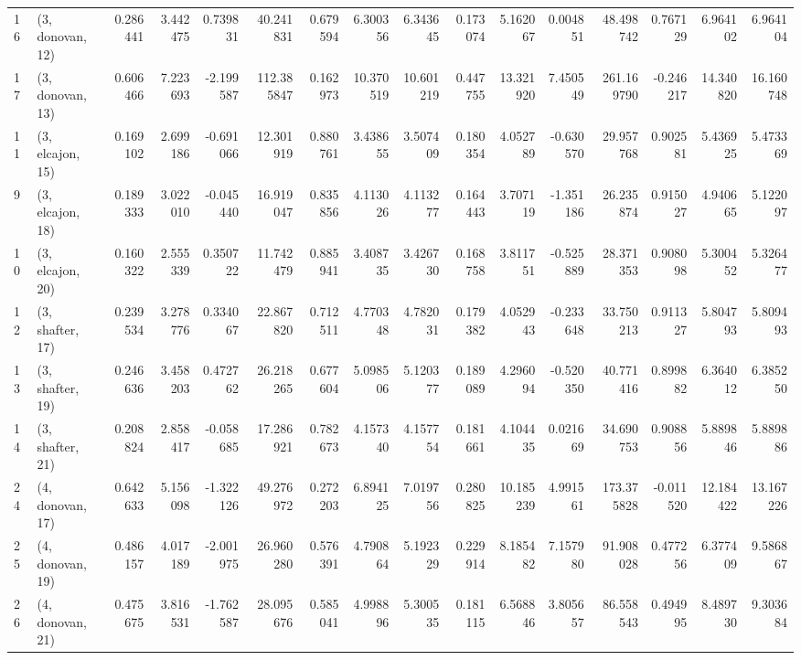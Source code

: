 \begin{tabular}{llrrrrrrrrrrrrrr}
16 &  (3, donovan, 12) &   0.286441 &  3.442475 &  0.739831 &   40.241831 &  0.679594 &   6.300356 &   6.343645 &  0.173074 &   5.162067 &  0.004851 &   48.498742 &  0.767129 &   6.964102 &   6.964104 \\
17 &  (3, donovan, 13) &   0.606466 &  7.223693 & -2.199587 &  112.385847 &  0.162973 &  10.370519 &  10.601219 &  0.447755 &  13.321920 &  7.450549 &  261.169790 & -0.246217 &  14.340820 &  16.160748 \\
11 &  (3, elcajon, 15) &   0.169102 &  2.699186 & -0.691066 &   12.301919 &  0.880761 &   3.438655 &   3.507409 &  0.180354 &   4.052789 & -0.630570 &   29.957768 &  0.902581 &   5.436925 &   5.473369 \\
9  &  (3, elcajon, 18) &   0.189333 &  3.022010 & -0.045440 &   16.919047 &  0.835856 &   4.113026 &   4.113277 &  0.164443 &   3.707119 & -1.351186 &   26.235874 &  0.915027 &   4.940665 &   5.122097 \\
10 &  (3, elcajon, 20) &   0.160322 &  2.555339 &  0.350722 &   11.742479 &  0.885941 &   3.408735 &   3.426730 &  0.168758 &   3.811751 & -0.525889 &   28.371353 &  0.908098 &   5.300452 &   5.326477 \\
12 &  (3, shafter, 17) &   0.239534 &  3.278776 &  0.334067 &   22.867820 &  0.712511 &   4.770348 &   4.782031 &  0.179382 &   4.052943 & -0.233648 &   33.750213 &  0.911327 &   5.804793 &   5.809493 \\
13 &  (3, shafter, 19) &   0.246636 &  3.458203 &  0.472762 &   26.218265 &  0.677604 &   5.098506 &   5.120377 &  0.189089 &   4.296094 & -0.520350 &   40.771416 &  0.899882 &   6.364012 &   6.385250 \\
14 &  (3, shafter, 21) &   0.208824 &  2.858417 & -0.058685 &   17.286921 &  0.782673 &   4.157340 &   4.157754 &  0.181661 &   4.104435 &  0.021669 &   34.690753 &  0.908856 &   5.889846 &   5.889886 \\
24 &  (4, donovan, 17) &   0.642633 &  5.156098 & -1.322126 &   49.276972 &  0.272203 &   6.894125 &   7.019756 &  0.280825 &  10.185239 &  4.991561 &  173.375828 & -0.011520 &  12.184422 &  13.167226 \\
25 &  (4, donovan, 19) &   0.486157 &  4.017189 & -2.001975 &   26.960280 &  0.576391 &   4.790864 &   5.192329 &  0.229914 &   8.185482 &  7.157980 &   91.908028 &  0.477256 &   6.377409 &   9.586867 \\
26 &  (4, donovan, 21) &   0.475675 &  3.816531 & -1.762587 &   28.095676 &  0.585041 &   4.998896 &   5.300535 &  0.181115 &   6.568846 &  3.805657 &   86.558543 &  0.494995 &   8.489730 &   9.303684 \\

\end{tabular}

